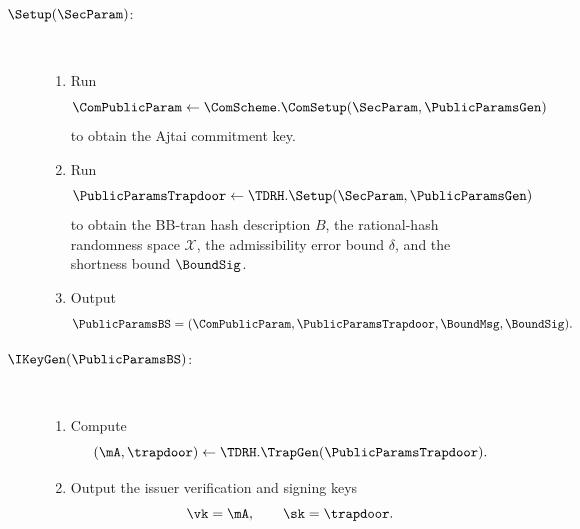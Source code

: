 \begin{description}
\item[$\Setup(\SecParam)$:]~
\begin{enumerate}[leftmargin=1.25em]
  \item Run
  \[
    \ComPublicParam\gets \ComScheme.\ComSetup(\SecParam,\PublicParamsGen)
  \]
  to obtain the Ajtai commitment key.
  \item Run
  \[
    \PublicParamsTrapdoor\gets \TDRH.\Setup(\SecParam,\PublicParamsGen)
  \]
  to obtain the BB-tran hash description $B$, the rational-hash randomness space $\mathcal X$, the admissibility
  error bound $\delta$, and the shortness bound $\BoundSig$.
  \item Output
  \[
    \PublicParamsBS=(\ComPublicParam,\PublicParamsTrapdoor,\BoundMsg,\BoundSig).
  \]
\end{enumerate}

\item[$\IKeyGen(\PublicParamsBS)$:]~
\begin{enumerate}[leftmargin=1.25em]
  \item Compute
  \[
    (\mA,\trapdoor)\gets \TDRH.\TrapGen(\PublicParamsTrapdoor).
  \]
  \item Output the issuer verification and signing keys
  \[
    \vk=\mA,
    \qquad
    \sk=\trapdoor.
  \]
\end{enumerate}


\end{description}

